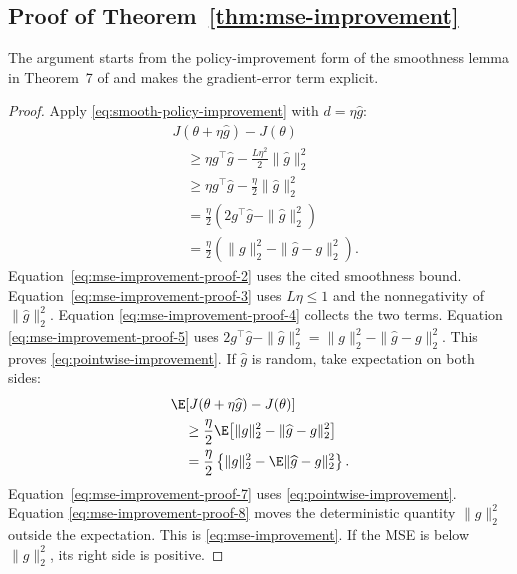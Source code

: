\subsection{Proof of Theorem~\ref{thm:mse-improvement}}

The argument starts from the policy-improvement form of the smoothness lemma in
Theorem~7 of \citet{papini2022smoothing} and makes the gradient-error term
explicit.

\begin{proof}
Apply \eqref{eq:smooth-policy-improvement} with
$d=\eta\widehat g$:
\begin{align}
  &J(\theta+\eta\widehat g)-J(\theta)
    \label{eq:mse-improvement-proof-1}\\
  &\quad\ge
    \eta g^\top\widehat g
    -\frac{L\eta^2}{2}\|\widehat g\|_2^2
    \label{eq:mse-improvement-proof-2}\\
  &\quad\ge
    \eta g^\top\widehat g
    -\frac{\eta}{2}\|\widehat g\|_2^2
    \label{eq:mse-improvement-proof-3}\\
  &\quad=
    \frac{\eta}{2}\left(
      2g^\top\widehat g-\|\widehat g\|_2^2
    \right)
    \label{eq:mse-improvement-proof-4}\\
  &\quad=
    \frac{\eta}{2}\left(
      \|g\|_2^2-\|\widehat g-g\|_2^2
    \right).
    \label{eq:mse-improvement-proof-5}
\end{align}
Equation~\eqref{eq:mse-improvement-proof-2} uses the cited smoothness bound.
Equation~\eqref{eq:mse-improvement-proof-3} uses $L\eta\le1$ and the
nonnegativity of $\|\widehat g\|_2^2$.  Equation
\eqref{eq:mse-improvement-proof-4} collects the two terms.  Equation
\eqref{eq:mse-improvement-proof-5} uses
$2g^\top\widehat g-\|\widehat g\|_2^2
=\|g\|_2^2-\|\widehat g-g\|_2^2$.  This proves
\eqref{eq:pointwise-improvement}.  If $\widehat g$ is random, take expectation
on both sides:
\begin{align}
  &\E\!\left[J(\theta+\eta\widehat g)-J(\theta)\right]
    \label{eq:mse-improvement-proof-6}\\
  &\quad\ge
    \frac{\eta}{2}\E\!\left[
      \|g\|_2^2-\|\widehat g-g\|_2^2
    \right]
    \label{eq:mse-improvement-proof-7}\\
  &\quad=
    \frac{\eta}{2}
    \left\{\|g\|_2^2-\E\|\widehat g-g\|_2^2\right\}.
    \label{eq:mse-improvement-proof-8}
\end{align}
Equation~\eqref{eq:mse-improvement-proof-7} uses
\eqref{eq:pointwise-improvement}.  Equation
\eqref{eq:mse-improvement-proof-8} moves the deterministic quantity
$\|g\|_2^2$ outside the expectation.  This is
\eqref{eq:mse-improvement}.  If the MSE is below $\|g\|_2^2$, its right side is
positive.
\end{proof}

